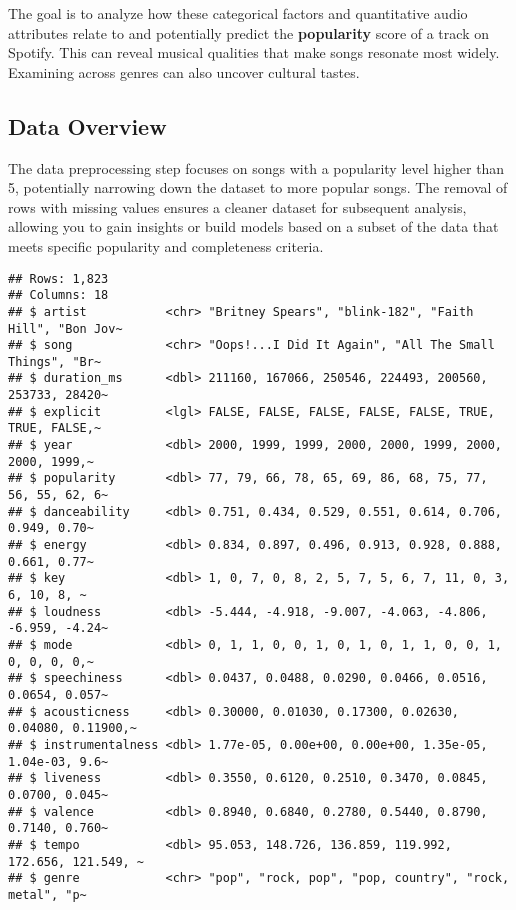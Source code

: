 \documentclass[
]{article}
\begin{document}
The goal is to analyze how these categorical factors and quantitative
audio attributes relate to and potentially predict the
\textbf{popularity} score of a track on Spotify. This can reveal musical
qualities that make songs resonate most widely. Examining across genres
can also uncover cultural tastes.

\hypertarget{data-overview}{%
\subsection{Data Overview}\label{data-overview}}

The data preprocessing step focuses on songs with a popularity level
higher than 5, potentially narrowing down the dataset to more popular
songs. The removal of rows with missing values ensures a cleaner dataset
for subsequent analysis, allowing you to gain insights or build models
based on a subset of the data that meets specific popularity and
completeness criteria.

\begin{verbatim}
## Rows: 1,823
## Columns: 18
## $ artist           <chr> "Britney Spears", "blink-182", "Faith Hill", "Bon Jov~
## $ song             <chr> "Oops!...I Did It Again", "All The Small Things", "Br~
## $ duration_ms      <dbl> 211160, 167066, 250546, 224493, 200560, 253733, 28420~
## $ explicit         <lgl> FALSE, FALSE, FALSE, FALSE, FALSE, TRUE, TRUE, FALSE,~
## $ year             <dbl> 2000, 1999, 1999, 2000, 2000, 1999, 2000, 2000, 1999,~
## $ popularity       <dbl> 77, 79, 66, 78, 65, 69, 86, 68, 75, 77, 56, 55, 62, 6~
## $ danceability     <dbl> 0.751, 0.434, 0.529, 0.551, 0.614, 0.706, 0.949, 0.70~
## $ energy           <dbl> 0.834, 0.897, 0.496, 0.913, 0.928, 0.888, 0.661, 0.77~
## $ key              <dbl> 1, 0, 7, 0, 8, 2, 5, 7, 5, 6, 7, 11, 0, 3, 6, 10, 8, ~
## $ loudness         <dbl> -5.444, -4.918, -9.007, -4.063, -4.806, -6.959, -4.24~
## $ mode             <dbl> 0, 1, 1, 0, 0, 1, 0, 1, 0, 1, 1, 0, 0, 1, 0, 0, 0, 0,~
## $ speechiness      <dbl> 0.0437, 0.0488, 0.0290, 0.0466, 0.0516, 0.0654, 0.057~
## $ acousticness     <dbl> 0.30000, 0.01030, 0.17300, 0.02630, 0.04080, 0.11900,~
## $ instrumentalness <dbl> 1.77e-05, 0.00e+00, 0.00e+00, 1.35e-05, 1.04e-03, 9.6~
## $ liveness         <dbl> 0.3550, 0.6120, 0.2510, 0.3470, 0.0845, 0.0700, 0.045~
## $ valence          <dbl> 0.8940, 0.6840, 0.2780, 0.5440, 0.8790, 0.7140, 0.760~
## $ tempo            <dbl> 95.053, 148.726, 136.859, 119.992, 172.656, 121.549, ~
## $ genre            <chr> "pop", "rock, pop", "pop, country", "rock, metal", "p~
\end{verbatim}
\end{document}
